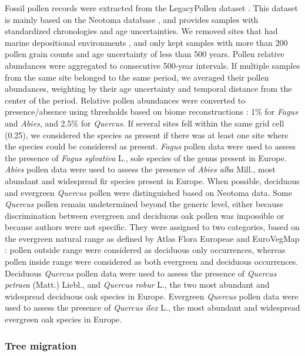 Fossil pollen records were extracted from the LegacyPollen dataset \citep{Herzschuh2022}. This dataset is mainly based on the Neotoma database \citep{Williams2018}, and provides samples with standardized chronologies and age uncertainties. We removed sites that had marine depositional environments \citep{Maguire2016}, and only kept samples with more than 200 pollen grain counts and age uncertainty of less than 500 years.
Pollen relative abundances were aggregated to consecutive 500-year intervals. If multiple samples from the same site belonged to the same period, we averaged their pollen abundances, weighting by their age uncertainty and temporal distance from the center of the period. Relative pollen abundances were converted to presence/absence using thresholds based on biome reconstructions \citep{Williams1998}: 1\% for \emph{Fagus} and \emph{Abies}, and 2.5\% for \emph{Quercus}. If several sites fell within the same grid cell (0.25\degree), we considered the species as present if there was at least one site where the species could be considered as present. \textit{Fagus} pollen data were used to assess the presence of \textit{Fagus sylvativa} L., sole species of the genus present in Europe. \textit{Abies} pollen data were used to assess the presence of \textit{Abies alba} Mill., most abundant and widespread fir species present in Europe. When possible, deciduous and evergreen \textit{Quercus} pollen were distinguished based on Neotoma data. Some \textit{Quercus} pollen remain undetermined beyond the generic level, either because discrimination between evergreen and deciduous oak pollen was impossible or because authors were not specific. They were assigned to two categories, based on the evergreen natural range as defined by Atlas Flora Europeae \citep{AFE2005} and EuroVegMap \citep{EVM2003}: pollen outside range were considered as deciduous only occurrences, whereas pollen inside range were considered as both evergreen and deciduous occurrences. Deciduous \textit{Quercus} pollen data were used to assess the presence of \textit{Quercus} \textit{petraea}  (Matt.) Liebl., and \textit{Quercus robur} L., the two most abundant and widespread deciduous oak species in Europe. Evergreen \textit{Quercus} pollen data were used to assess the presence of \textit{Quercus ilex} L., the most abundant and widespread evergreen oak species in Europe.

\subsubsection{Tree migration}\label{migration}

